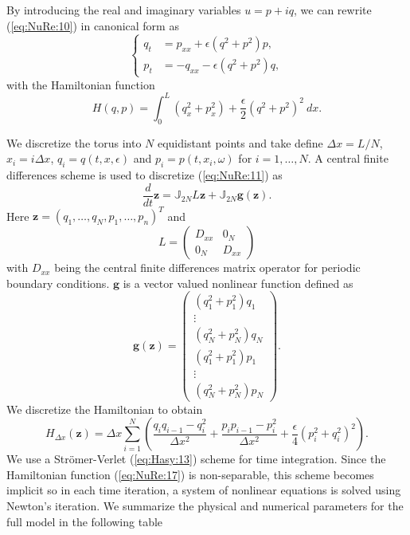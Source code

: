 By introducing the real and imaginary variables $u = p + iq$, we can rewrite (\ref{eq:NuRe:10}) in canonical form as
\begin{equation} \label{eq:NuRe:12}
\left\{
\begin{aligned}
 q_t &= p_{xx} + \epsilon (q^2+p^2)p, \\
 p_t &= -q_{xx} - \epsilon (q^2 + p^2)q,
\end{aligned}
\right.
\end{equation}
with the Hamiltonian function
\begin{equation} \label{eq:NuRe:13}
	H(q,p) = \int_{0}^{L} (q_x^2 + p_x^2) + \frac \epsilon 2 (q^2 + p^2)^2\ dx.
\end{equation}

We discretize the torus into $N$ equidistant points and take define $\Delta x = L/N$, $x_i = i\Delta x$, $q_i=q(t,x,\epsilon)$ and $p_i = p(t,x_i,\omega)$ for $i = 1 ,\dots,N$. A central finite differences scheme is used to discretize (\ref{eq:NuRe:11}) as
\begin{equation}  \label{eq:NuRe:14}
	\frac{d}{dt} \mathbf z = \mathbb J_{2N} L\mathbf z + \mathbb J_{2N} \mathbf g(\mathbf z).
\end{equation}
Here $\mathbf z = (q_1,\dots,q_N,p_1,\dots,p_n)^T$ and
\begin{equation}  \label{eq:NuRe:15}
	L = 
	\begin{pmatrix}
		D_{xx} & 0_N \\
		0_N & D_{xx}
	\end{pmatrix}
\end{equation}
with $D_{xx}$ being the central finite differences matrix operator for periodic boundary conditions. $\mathbf g$ is a vector valued nonlinear function defined as
\begin{equation}  \label{eq:NuRe:16}
	\mathbf g(\mathbf z) =
	\begin{pmatrix}
	(q_1^2 + p_1^2)q_1 \\
	\vdots \\
	(q_N^2 + p_N^2)q_N \\
	(q_1^2 + p_1^2)p_1 \\
	\vdots \\
	(q_N^2 + p_N^2)p_N
	\end{pmatrix}.
\end{equation}
We discretize the Hamiltonian to obtain
\begin{equation}  \label{eq:NuRe:17}
	H_{\Delta x}(\mathbf z) = {\Delta x}\sum_{i=1}^{N} \left( \frac{q_i q_{i-1} - q_i^2}{\Delta x ^2} + \frac{p_i p_{i-1} - p_i^2}{\Delta x ^2} + \frac \epsilon 4 (p_i^2 + q_i^2)^2  \right).
\end{equation}
We use a Str\"omer-Verlet (\ref{eq:Hasy:13}) scheme for time integration. Since the Hamiltonian function (\ref{eq:NuRe:17}) is non-separable, this scheme becomes implicit so in each time iteration, a system of nonlinear equations is solved using Newton's iteration. We summarize the physical and numerical parameters for the full model in the following table

